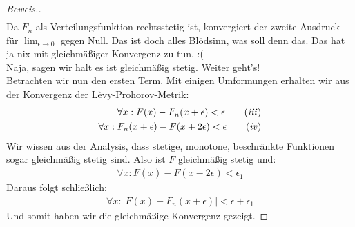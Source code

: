 \begin{proof}[Beweis.]
\begin{align*}
\end{align*}
Da $F_n$ als Verteilungsfunktion rechtsstetig ist, konvergiert der zweite Ausdruck für $\lim_{\epsilon \rightarrow 0}$ gegen Null.
Das ist doch alles Blödsinn, was soll denn das. Das hat ja nix mit gleichmäßiger Konvergenz zu tun. :( \\
Naja, sagen wir halt es ist gleichmäßig stetig. Weiter geht's! \\
Betrachten wir nun den ersten Term. Mit einigen Umformungen erhalten wir aus der Konvergenz der Lèvy-Prohorov-Metrik:
\begin{align*}
 \forall x: F(x) - F_n(x + \epsilon) < \epsilon \tag{\textit{iii}} \label{eq:third} \\
 \forall x: F_n(x + \epsilon) - F(x + 2\epsilon) < \epsilon \tag{\textit{iv}} \label{eq:forth} \\
\end{align*}
Wir wissen aus der Analysis, dass stetige, monotone, beschränkte Funktionen sogar gleichmäßig stetig sind.
Also ist $F$ gleichmäßig stetig und:
\begin{align*}
  \forall x: F(x) - F(x - 2\epsilon) < \epsilon_1
\end{align*}
Daraus folgt schließlich:
\begin{align*}
  \forall x: | F(x) - F_n(x + \epsilon) | < \epsilon + \epsilon_1
\end{align*}
Und somit haben wir die gleichmäßige Konvergenz gezeigt.
\end{proof}
